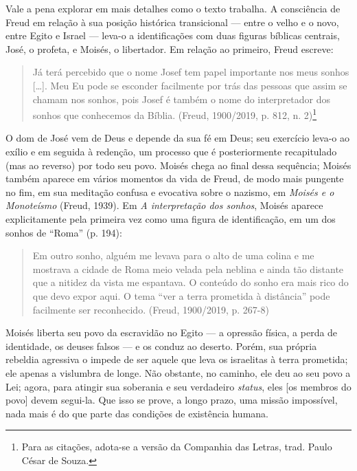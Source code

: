Vale a pena explorar em mais detalhes como o texto trabalha. A
consciência de Freud em relação à sua posição histórica transicional ---
entre o velho e o novo, entre Egito e Israel --- leva-o a identificações
com duas figuras bíblicas centrais, José, o profeta, e Moisés, o
libertador. Em relação ao primeiro, Freud escreve:

\begin{quote}
Já terá percebido que o nome Josef tem papel importante nos meus sonhos
{[}\ldots{}{]}. Meu Eu pode se esconder facilmente por trás das pessoas que
assim se chamam nos sonhos, pois Josef é também o nome do interpretador
dos sonhos que conhecemos da Bíblia. (Freud, 1900/2019, p. 812, n.
2)\footnote{Para as citações, adota-se a versão da Companhia das Letras,
  trad. Paulo César de Souza.}
\end{quote}

O dom de José vem de Deus e depende da sua fé em Deus; seu exercício
leva-o ao exílio e em seguida à redenção, um processo que é
posteriormente recapitulado (mas ao reverso) por todo seu povo. Moisés
chega ao final dessa sequência; Moisés também aparece em vários momentos
da vida de Freud, de modo mais pungente no fim, em sua meditação confusa
e evocativa sobre o nazismo, em \emph{Moisés e o Monoteísmo} (Freud,
1939). Em \emph{A interpretação dos sonhos}, Moisés aparece
explicitamente pela primeira vez como uma figura de identificação, em um
dos sonhos de ``Roma'' (p. 194):

\begin{quote}
Em outro sonho, alguém me levava para o alto de uma colina e me mostrava
a cidade de Roma meio velada pela neblina e ainda tão distante que a
nitidez da vista me espantava. O conteúdo do sonho era mais rico do que
devo expor aqui. O tema ``ver a terra prometida à distância'' pode
facilmente ser reconhecido. (Freud, 1900/2019, p. 267-8)
\end{quote}

Moisés liberta seu povo da escravidão no Egito --- a opressão física, a
perda de identidade, os deuses falsos --- e os conduz ao deserto. Porém,
sua própria rebeldia agressiva o impede de ser aquele que leva os
israelitas à terra prometida; ele apenas a vislumbra de longe. Não
obstante, no caminho, ele deu ao seu povo a Lei; agora, para atingir sua
soberania e seu verdadeiro \emph{status}, eles {[}os membros do povo{]}
devem segui-la. Que isso se prove, a longo prazo, uma missão impossível,
nada mais é do que parte das condições de existência humana.

